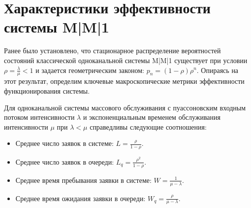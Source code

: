 \section{Характеристики эффективности системы M|M|1}

Ранее было установлено, что стационарное распределение вероятностей состояний классической одноканальной системы M|M|1 существует при условии $\rho = \frac{\lambda}{\mu} < 1$ и задается геометрическим законом: $p_n = (1 - \rho)\rho^n$. Опираясь на этот результат, определим ключевые макроскопические метрики эффективности функционирования системы.

\begin{statement}
Для одноканальной системы массового обслуживания с пуассоновским входным потоком интенсивности $\lambda$ и экспоненциальным временем обслуживания интенсивности $\mu$ при $\lambda < \mu$ справедливы следующие соотношения:
\begin{itemize}
    \item Среднее число заявок в системе: $L = \frac{\rho}{1 - \rho}$.
    \item Среднее число заявок в очереди: $L_q = \frac{\rho^2}{1 - \rho}$.
    \item Среднее время пребывания заявки в системе: $W = \frac{1}{\mu - \lambda}$.
    \item Среднее время ожидания заявки в очереди: $W_q = \frac{\rho}{\mu - \lambda}$.
\end{itemize}
\end{statement}

